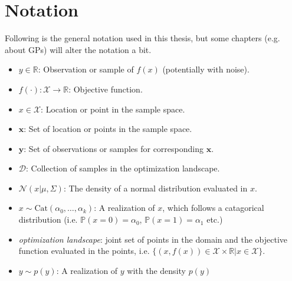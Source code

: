 

\section{Notation}
Following is the general notation used in this thesis, but some chapters (e.g. about GPs) will alter the notation a bit. 
\begin{itemize}[noitemsep]
    \item $y \in \mathbb{R}$: Observation or sample of $f(x)$ (potentially with noise).
    \item $f(\cdot): \mathcal{X} \rightarrow \mathbb{R}$: Objective function.
    \item $x \in \mathcal{X}$: Location or point in the sample space.
    \item $\textbf{x}$: Set of location or points in the sample space.
    \item $\textbf{y}$: Set of observations or samples for corresponding $\textbf{x}$.
    \item $\mathcal{D}$: Collection of samples in the optimization landscape. 
    \item $\mathcal{N}(x|\mu, \Sigma)$: The density of a normal distribution evaluated in $x$.
    \item $x \sim \text{Cat}(\alpha_0, \dots, \alpha_{k})$: A realization of $x$, which follows a
    catagorical distribution (i.e. $\mathbb{P}(x=0) = \alpha_0$, $\mathbb{P}(x=1) = \alpha_1$ etc.)
    \item \textit{optimization landscape}: joint set of points in the domain and the objective function
    evaluated in the points, i.e. $\{(x,f(x))\in \mathcal{X} \times \mathbb{R}| x \in \mathcal{X}\}$.
    \item $y \sim p(y)$: A realization of $y$ with the density $p(y)$
\end{itemize}


